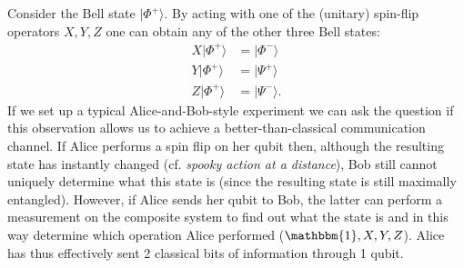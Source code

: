 
    \begin{method}
        Consider the Bell state $|\Phi^+\rangle$. By acting with one of the (unitary) spin-flip operators $X,Y,Z$ one can obtain any of the other three Bell states:
        \begin{align}
            X|\Phi^+\rangle &= |\Phi^-\rangle\nonumber\\
            Y|\Phi^+\rangle &= |\Psi^+\rangle\\
            Z|\Phi^+\rangle &= |\Psi^-\rangle.\nonumber
        \end{align}
        If we set up a typical Alice-and-Bob-style experiment we can ask the question if this observation allows us to achieve a better-than-classical communication channel. If Alice performs a spin flip on her qubit then, although the resulting state has instantly changed (cf. \textit{spooky action at a distance}), Bob still cannot uniquely determine what this state is (since the resulting state is still maximally entangled). However, if Alice sends her qubit to Bob, the latter can perform a measurement on the composite system to find out what the state is and in this way determine which operation Alice performed ($\mathbbm{1},X,Y,Z$). Alice has thus effectively sent 2 classical bits of information through 1 qubit.
    \end{method}

